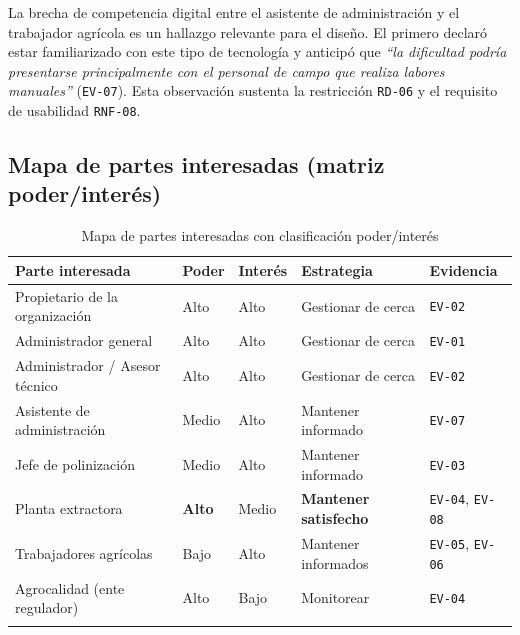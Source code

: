 \documentclass[11pt,a4paper]{article}
\newcommand{\id}[1]{\texttt{\begingroup\hyphenpenalty=10000\relax#1\endgroup}}
\renewcommand{\id}[1]{\texttt{#1}}
\begin{document}
\vspace{0.2cm}
\noindent{}

\noindent
La brecha de competencia digital entre el asistente de administración y el trabajador agrícola es
un hallazgo relevante para el diseño. El primero declaró estar familiarizado con este tipo de
tecnología y anticipó que \emph{``la dificultad podría presentarse principalmente con el personal de
campo que realiza labores manuales''} (\id{EV-07}). Esta observación sustenta la restricción
\id{RD-06} y el requisito de usabilidad \id{RNF-08}.

\subsection{Mapa de partes interesadas (matriz poder/interés)}

\begin{longtable}{|L{4.2cm}|C{1.8cm}|C{1.8cm}|L{3.4cm}|C{2.2cm}|}
\hline
{}\textbf{Parte interesada} & \textbf{Poder} & \textbf{Interés} & \textbf{Estrategia} & \textbf{Evidencia} \\
\hline
\endhead
Propietario de la organización & Alto & Alto & Gestionar de cerca & \id{EV-02} \\ \hline
Administrador general & Alto & Alto & Gestionar de cerca & \id{EV-01} \\ \hline
Administrador / Asesor técnico & Alto & Alto & Gestionar de cerca & \id{EV-02} \\ \hline
Asistente de administración & Medio & Alto & Mantener informado & \id{EV-07} \\ \hline
Jefe de polinización & Medio & Alto & Mantener informado & \footnotesize \id{EV-03} \\ \hline
Planta extractora & \textbf{Alto} & Medio & \textbf{Mantener satisfecho} & \id{EV-04}, \id{EV-08} \\ \hline
Trabajadores agrícolas & Bajo & Alto & Mantener informados & \id{EV-05}, \id{EV-06} \\ \hline
Agrocalidad (ente regulador) & Alto & Bajo & Monitorear & \footnotesize \id{EV-04} \\ \hline
\caption{Mapa de partes interesadas con clasificación poder/interés}
\end{longtable}
\end{document}
